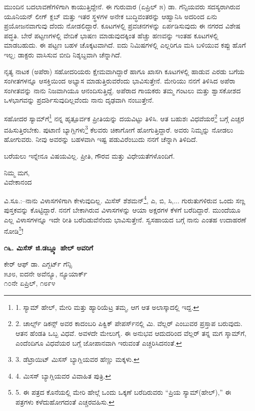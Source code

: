ಮುಂದಿನ ಬದಲಾವಣೆಗಳಿಗಾಗಿ ಕಾಯುತ್ತಿದ್ದೇನೆ. ಈ ಗುರುವಾರ (ಏಪ್ರಿಲ್ ೫) ಡಾ. ಗೆನ್ಸಿಯವರು ಸದಸ್ಯರಾಗಿರುವ ಯೂನಿಯನ್ ಲೀಗ್ ಕ್ಲಬ್ ಮತ್ತು ಇತರ ಸ್ಥಳಗಳ ಅನೇಕ ಬುದ್ಧಿವಂತರನ್ನು ಆಹ್ವಾನಿಸಿ ಅದರಿಂದ ಏನು ಪ್ರಯೋಜನವಾಗುವು ದೆಂದು ನೋಡಲಿದ್ದಾರೆ. ಕೂಟಗಳಲ್ಲಿ ಪ್ರವಚನಗಳನ್ನು ಏರ್ಪಡಿಸುವುದು ಈ ನಗರದ ವಿಶೇಷ ಪದ್ಧತಿ. ಬೇರೆ ಪಟ್ಟಣಗಳಲ್ಲಿ ವೇದಿಕೆ ಭಾಷಣ ಮಾಡುವುದಕ್ಕಿಂತ ಹೆಚ್ಚು ಹಣವನ್ನು ಇಂತಹ ಕೂಟಗಳಲ್ಲಿ ಮಾಡಬಹುದು. ಈ ಪಟ್ಟಣ ಬಹಳ ಚೊಕ್ಕಟವಾಗಿದೆ. ಐದು ನಿಮಿಷಗಳಲ್ಲಿ ಎಲ್ಲರಿಗೂ ಮಸಿ ಬಳಿಯುವ ಕಪ್ಪು ಹೊಗೆ ಇಲ್ಲ; ಡಾಕ್ಟರು ವಾಸಿಸುವ ಬೀದಿ ನಿಶ್ಶಬ್ದವಾಗಿ ಚೆನ್ನಾಗಿದೆ.

ನೃತ್ಯ ನಾಟಕ (ಅಪೆರಾ) ಸಹೋದರಿಯರು ಕ್ಷೇಮವಾಗಿದ್ದಾರೆ ಹಾಗೂ ಖಾಸಗಿ ಕೂಟಗಳಲ್ಲಿ ಹಾಡುವ ಎರಡು ಬಗೆಯ ಸಂಗೀತಗಳನ್ನೂ ಆಸಕ್ತಿಯಿಂದ ಅಭ್ಯಾಸ ಮಾಡುತ್ತಿರುವರೆಂದು ಭಾವಿಸುತ್ತೇನೆ. ಮೇರಿಯು ನನಗೆ ತಿಳಿಸಿದ ಅಪೆರಾ ಸಂಗೀತವನ್ನು ನಾನು ನಿಜವಾಗಿಯೂ ಆನಂದಿಸುತ್ತಿದ್ದೆ. ಅಪೆರಾದ ಗಾಯಕರು ತಮ್ಮ ಗಂಟಲು ಮತ್ತು ಶ್ವಾಸಕೋಶದ ಒಳಭಾಗವನ್ನು ಪ್ರದರ್ಶಿಸುವುದಿಲ್ಲವೆಂದು ನಾನು ದೃಢವಾಗಿ ನಂಬುತ್ತೇನೆ.

ಸಹೋದರ ಸ್ಯಾಮ್​ಗೆ\footnote{1. ಸ್ಯಾಮ್​ ಹೇಲ್, ಮೇರಿ ಮತ್ತು ಹ್ಯಾರಿಯೆಟ್ರ ತಮ್ಮ, ಆಗ ಆತ ಅಲಾಸ್ಕಾದಲ್ಲಿ ಇದ್ದ.} ನನ್ನ ಹೃತ್ಪೂರ್ವಕ ಪ್ರೀತಿಯನ್ನು ದಯವಿಟ್ಟು ತಿಳಿಸಿ. ಆತ ಬಹುಶಃ ವಿಧವೆಯರ\footnote{2. ಚಾರ್ಲ್ಸ್ ಡಿಕನ್ಸ್ ಅವರ ಕಾದಂಬರಿ ಪಿಕ್ವಿಕ್ ಪೇಪರ್ಸ್‌ನಲ್ಲಿ ಮಿ. ವೆಲ್ಲರ್ ಎಂಬುವರ ಪ್ರಸ್ತಾಪ ಬರುವುದು. ಆತನ ಹೆಂಡತಿ ಒಬ್ಬ ವಿಧವೆ. ಅವಳದೇ ಮೇಲುಗೈ. ಈ ಅನುಭವ ಆದುದರಿಂದ ವೆಲ್ಲರ್ ತನ್ನ ಮಗ ಸ್ಶಾಮ್​ಗೆ, ಎಂದೆಂದಿಗೂ ವಿಧವೆಯರ ಬಗ್ಗೆ ಜೋಪಾನವಾಗಿ ಇರುವಂತೆ ಎಚ್ಚರಿಸಿದನಂತೆ.} ಬಗ್ಗೆ ಎಚ್ಚರ ವಹಿಸುತ್ತಿರಬೇಕು. ಪುಟಾಣಿ ಬ್ಯಾಗ್ಲಿಗಳು\footnote{3. ಡೆಟ್ರಾಯಿಟ್ ಮಿಸಸ್ ಬ್ಯಾಗ್ಲಿಯವರ ಹೆಣ್ಣು ಮಕ್ಕಳು.} ಕೆಲವರು ಚಿಕಾಗೋಗೆ ಹೋಗುತ್ತಿದ್ದಾರೆ. ಅವರು ನಿಮ್ಮನ್ನು ನೋಡಲು ಹೋಗುವರು. ನೀವು ಅವರನ್ನು ಬಹಳವಾಗಿ ಇಷ್ಟ ಪಡುವಿರೆಂಬುದು ನನಗೆ ಚೆನ್ನಾಗಿ ತಿಳಿದಿದೆ.

ಬರೆಯಲು ಇನ್ನೇನೂ ವಿಷಯವಿಲ್ಲ. ಪ್ರೀತಿ, ಗೌರವ ಮತ್ತು ವಿಧೇಯತೆಗಳೊಂದಿಗೆ.

\begin{flushright}
ನಿಮ್ಮ ಮಗ,\\ವಿವೇಕಾನಂದ
\end{flushright}

ವಿ.ಸೂ.:–ನಾನು ವಿಳಾಸಗಳಿಗಾಗಿ ಕೇಳುವುದಿಲ್ಲ. ಮಿಸೆಸ್ ಶೆಶಮನ್\footnote{4. ಮಿಸಸ್ ಬ್ಯಾಗ್ಲಿಯವರ ವಿವಾಹಿತ ಪುತ್ರಿ.}, ಎ, ಬಿ, ಸಿ,... ಗುರುತುಗಳಿರುವ ಒಂದು ಸಣ್ಣ ಪುಸ್ತಕವನ್ನು ಕೊಟ್ಟಿದ್ದಾರೆ. ನನಗೆ ಬೇಕಾಗಿರುವ ವಿಳಾಸಗಳನ್ನು ಆಯಾ ಅಕ್ಷರಗಳ ಕೆಳಗೆ ಬರೆದಿದ್ದಾರೆ. ಮುಂದೆಯೂ ಎಲ್ಲ ವಿಳಾಸಗಳನ್ನೂ ಇದೇ ರೀತಿ ಬರೆದಿಡುವೆನೆಂದು ಭಾವಿಸುತ್ತೇನೆ. ಸ್ವಸಹಾಯದ ಬಗ್ಗೆ ನಾನು ಎಂತಹ ಉದಾಹರಣೆ ನೋಡಿ\footnote{5. ಈ ಪತ್ರದ ಕೊನೆಯಲ್ಲಿ ಮೇರಿ ಹೇಲ್ಗೆ ಒಂದು ಒಕ್ಕಣೆ ಬರೆದಿರುವರು “ಪ್ರಿಯ ಸ್ಯಾಮ್​ (ಹೇಲ್),” ಈ ಪತ್ರಗಳು ಕಳೆದುಹೋಗದಂತೆ ಎಚ್ಚರವಹಿಸು.}!

\begin{center}
\textbf{೧೬. ಮಿಸೆಸ್ ಜಿ.ಡಬ್ಲ್ಯೂ ಹೇಲ್ ಅವರಿಗೆ}
\end{center}

\begin{flushright}
ಕೇರ್ ಆಫ್ ಡಾ. ಎಗ್ಬರ್ಟ್ ಗೆನ್ಸಿ\\೫೨೮, ಐದನೇ ಅವೆನ್ಯೂ, ನ್ಯೂಯಾರ್ಕ್\\೧೦ನೇ ಏಪ್ರಿಲ್, ೧೮೯೪
\end{flushright}

